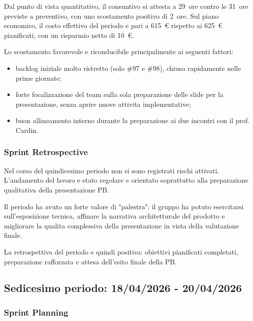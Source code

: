 \documentclass[a4paper, 11pt, oneside]{scrartcl} %
\begin{document}
Dal punto di vista quantitativo, il consuntivo si attesta a 29~ore contro le 31~ore previste a preventivo, con uno scostamento positivo di 2~ore. Sul piano economico, il costo effettivo del periodo e pari a 615~€ rispetto ai 625~€ pianificati, con un risparmio netto di 10~€.

Lo scostamento favorevole e riconducibile principalmente ai seguenti fattori:
\begin{itemize}[noitemsep, topsep=2pt]
    \item backlog iniziale molto ristretto (solo \#97 e \#98), chiuso rapidamente nelle prime giornate;
    \item forte focalizzazione del team sulla sola preparazione delle slide per la presentazione, senza aprire nuove attivita implementative;
    \item buon allineamento interno durante la preparazione ai due incontri con il prof. Cardin.
\end{itemize}

\subsubsection*{Sprint Retrospective}

Nel corso del quindicesimo periodo non si sono registrati rischi attivati. L'andamento del lavoro e stato regolare e orientato soprattutto alla preparazione qualitativa della presentazione PB.

Il periodo ha avuto un forte valore di "palestra": il gruppo ha potuto esercitarsi sull'esposizione tecnica, affinare la narrativa architetturale del prodotto e migliorare la qualita complessiva della presentazione in vista della valutazione finale.

La retrospettiva del periodo e quindi positiva: obiettivi pianificati completati, preparazione rafforzata e attesa dell'esito finale della PB.

\newpage

\subsection{Sedicesimo periodo: 18/04/2026 - 20/04/2026}

\subsubsection*{Sprint Planning}
\end{document}
